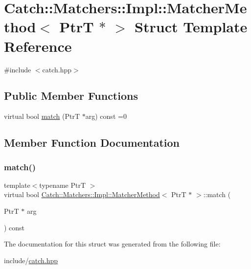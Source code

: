 \hypertarget{structCatch_1_1Matchers_1_1Impl_1_1MatcherMethod_3_01PtrT_01_5_01_4}{}\section{Catch\+:\+:Matchers\+:\+:Impl\+:\+:Matcher\+Method$<$ PtrT $\ast$ $>$ Struct Template Reference}
\label{structCatch_1_1Matchers_1_1Impl_1_1MatcherMethod_3_01PtrT_01_5_01_4}


{\ttfamily \#include $<$catch.\+hpp$>$}

\subsection*{Public Member Functions}
\begin{DoxyCompactItemize}
\item 
virtual bool \mbox{\hyperlink{structCatch_1_1Matchers_1_1Impl_1_1MatcherMethod_3_01PtrT_01_5_01_4_a5fdd64f9509724f32ffc73cb320181d1}{match}} (PtrT $\ast$arg) const =0
\end{DoxyCompactItemize}


\subsection{Member Function Documentation}
\mbox{\label{structCatch_1_1Matchers_1_1Impl_1_1MatcherMethod_3_01PtrT_01_5_01_4_a5fdd64f9509724f32ffc73cb320181d1}} 
\subsubsection{\texorpdfstring{match()}{match()}}
{\footnotesize\ttfamily template$<$typename PtrT $>$ \\
virtual bool \mbox{\hyperlink{structCatch_1_1Matchers_1_1Impl_1_1MatcherMethod}{Catch\+::\+Matchers\+::\+Impl\+::\+Matcher\+Method}}$<$ PtrT $\ast$ $>$\+::match (\begin{DoxyParamCaption}\item[{PtrT $\ast$}]{arg }\end{DoxyParamCaption}) const\hspace{0.3cm}{\ttfamily [pure virtual]}}



The documentation for this struct was generated from the following file\+:\begin{DoxyCompactItemize}
\item 
include/\mbox{\hyperlink{catch_8hpp}{catch.\+hpp}}\end{DoxyCompactItemize}
